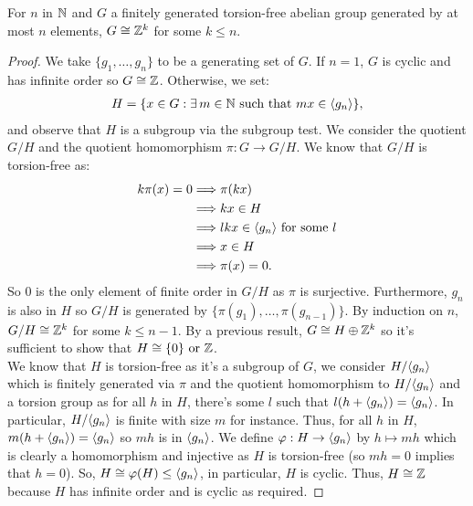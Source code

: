For $n$ in $\mathbb{N}$ and $G$ a finitely generated torsion-free abelian group
generated by at most $n$ elements, $G \cong \mathbb{Z}^k$ for some $k \leq n$.

\begin{proof}
    We take $\{g_1, \ldots, g_n\}$ to be a generating set of $G$. If
    $n = 1$, $G$ is cyclic and has infinite order so $G \cong \mathbb{Z}$.
    Otherwise, we set: \begin{align*}
        H = \{x \in G : \exists \, m \in \mathbb{N} \text{ such that } mx \in \langle g_n \rangle \},     
    \end{align*} and observe that $H$ is a subgroup via the subgroup test. We 
    consider the quotient $G / H$ and the quotient homomorphism $\pi : G \to G / H$.
    We know that $G / H$ is torsion-free as: \begin{align*}
        k\pi(x) = 0 
        &\Longrightarrow \pi(kx) \\
        &\Longrightarrow kx \in H \\
        &\Longrightarrow lkx \in \langle g_n \rangle \text{ for some } l \\
        &\Longrightarrow x \in H \\
        &\Longrightarrow \pi(x) = 0.
    \end{align*} So $0$ is the only element of finite order in $G / H$
    as $\pi$ is surjective. Furthermore, $g_n$ is also in $H$ so $G / H$
    is generated by $\{\pi(g_1), \ldots, \pi(g_{n - 1})\}$.
    By induction on $n$, $G / H \cong \mathbb{Z}^k$ for some $k \leq n - 1$.
    By a previous result, $G \cong H \oplus \mathbb{Z}^k$ so it's sufficient
    to show that $H \cong \{0\} \text{ or } \mathbb{Z}$. 
    \\[\baselineskip]
    We know that $H$
    is torsion-free as it's a subgroup of $G$, we consider 
    $H / \langle g_n \rangle$ which is finitely generated via $\pi$ and the quotient 
    homomorphism to $H / \langle g_n \rangle$ and a torsion group as for all
    $h$ in $H$, there's some $l$ such that $l(h + \langle g_n \rangle) = \langle g_n \rangle$.
    In particular, $H / \langle g_n \rangle$ is finite with size $m$ for instance.
    Thus, for all $h$ in $H$, $m(h + \langle g_n \rangle) = \langle g_n \rangle$ so
    $mh$ is in $\langle g_n \rangle$. We define $\varphi : H \to \langle g_n \rangle$
    by $h \mapsto mh$ which is clearly a homomorphism and injective
    as $H$ is torsion-free (so $mh = 0$ implies that $h = 0$).
    So, \linebreak 
    $H \cong \varphi(H) \leq \langle g_n \rangle$, in particular, $H$ is cyclic.
    Thus, $H \cong \mathbb{Z}$ because $H$ has infinite
    order and is cyclic as required.
\end{proof}

